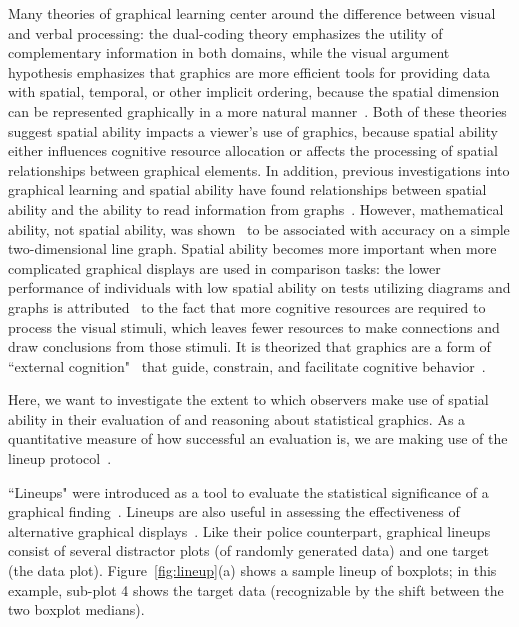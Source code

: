 \documentclass[journal]{vgtc}\usepackage[]{graphicx}\usepackage[]{color}
\begin{document}
Many theories of graphical learning center around the difference between visual and verbal processing: the dual-coding theory emphasizes the utility of complementary information in both domains, while the visual argument hypothesis emphasizes that graphics are more efficient tools for providing data with spatial, temporal, or other implicit ordering, because the spatial dimension can be represented graphically in a more natural manner~\cite{vekiri2002value}. Both of these theories suggest spatial ability impacts a viewer's use of graphics, because spatial ability either influences cognitive resource allocation or affects the processing of spatial relationships between graphical elements. In addition, previous investigations into graphical learning and spatial ability have found relationships between spatial ability and the ability to read information from graphs~\cite{lowrie2007solving}. 
However,  mathematical ability, not spatial ability, was shown~\cite{shah1995conceptual} to be associated with accuracy on a simple two-dimensional line graph. 
Spatial ability becomes more important when more complicated graphical displays are used in comparison tasks: the lower performance of individuals with low spatial ability on tests utilizing diagrams and graphs is attributed~\cite{mayer1994whom} to the fact that more cognitive resources are required to process the visual stimuli, which leaves fewer resources to make connections and draw conclusions from those stimuli. It is theorized that graphics are a form of ``external cognition"~\cite{scaife1996external} that guide, constrain, and facilitate cognitive behavior~\cite{zhang1997nature}. 

Here, we want to investigate the extent to which observers make use of spatial ability in their evaluation of and reasoning about statistical graphics. As a quantitative measure of how successful an evaluation is, we are making use of the lineup protocol~\cite{buja2009statistical, wickham2010graphical, majumder2013validation}. 

``Lineups" were introduced as a tool to evaluate the statistical significance of a graphical finding~\cite{wickham2010graphical}. Lineups are also useful in assessing the effectiveness of alternative graphical displays~\cite{hofmann2012graphical, loy:2015}. Like their police counterpart, graphical lineups consist of several distractor plots (of randomly generated data) and one target (the data plot).  Figure~\ref{fig:lineup}(a) shows a sample lineup of boxplots; in this example, sub-plot 4 shows the target data (recognizable by the shift between the two boxplot medians).
\end{document}
